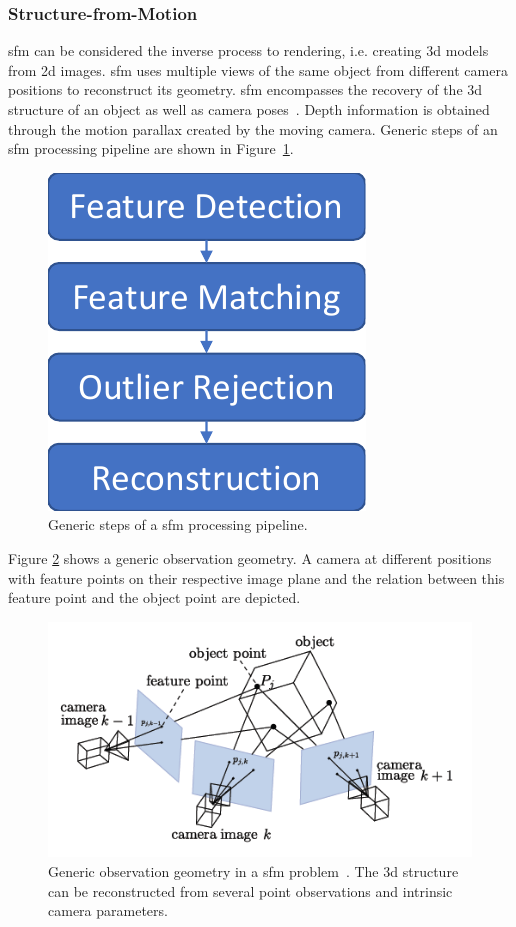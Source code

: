 \subsubsection{Structure-from-Motion}
\Gls{sfm} can be considered the inverse process to rendering, i.e. creating \gls{3d} models from \gls{2d} images. \gls{sfm} uses multiple views of the same object from different camera positions to reconstruct its geometry. \Gls{sfm} encompasses the recovery of the \gls{3d} structure of an object as well as camera poses~\cite{szeliski2010computer}. Depth information is obtained through the motion parallax created by the moving camera. Generic steps of an \gls{sfm} processing pipeline are shown in Figure~\ref{fig:sfm_steps}.

\begin{figure}[htb]
    \centering
    \includegraphics[width=.25\textwidth]{doc/thesis/0_figures/sfm/SfM.pdf}
    \caption{Generic steps of a \gls{sfm} processing pipeline.}
    \label{fig:sfm_steps}
\end{figure}

Figure \ref{fig:sfm_geometry} shows a generic observation geometry. A camera at different positions with feature points on their respective image plane and the relation between this feature point and the object point are depicted. 

\begin{figure}[htb]
    \centering
    \includegraphics[width=\textwidth]{doc/thesis/0_figures/sfm/sfm_geometry.png}
    \caption{Generic observation geometry in a \gls{sfm} problem~\cite{andrews2019asteroid}. The \gls{3d} structure can be reconstructed from several point observations and intrinsic camera parameters.}
    \label{fig:sfm_geometry}
\end{figure}

